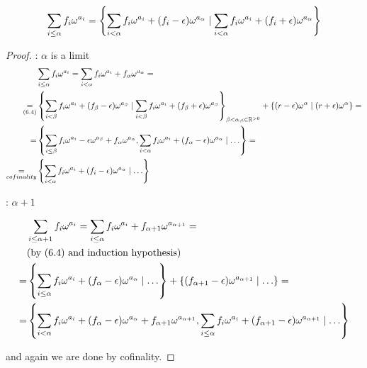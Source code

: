 
\begin{corollary} %
\begin{align*}
	\sum_{i \leq \alpha} f_i\omega^{a_i} =
	\left\{  \sum_{i < \alpha} f_i\omega^{a_i} + (f_i - \epsilon) \omega^{a_\alpha} \mid
	\sum_{i < \alpha} f_i\omega^{a_i} + (f_i + \epsilon) \omega^{a_\alpha}  \right\}
\end{align*}
 \end{corollary}

\begin{proof} %

: $\alpha$ is a limit
\begin{align*}
	&\sum_{i \leq \alpha} f_i\omega^{a_i} = \sum_{i < \alpha} f_i\omega^{a_i} + f_\alpha\omega^{a_\alpha} = \\ \underset{(6.4)}{=}
	&\left\{ \sum_{i < \beta} f_i \omega^{a_i} + (f_\beta - \epsilon)\omega^{a_\beta} \mid
	\sum_{i < \beta} f_i \omega^{a_i} + (f_\beta + \epsilon)\omega^{a_\beta} \right\}_{\beta < \alpha, \epsilon \in \mathbb{R}^{>0}}
	+ \left\{ (r - \epsilon) \omega^\alpha \mid (r+\epsilon)\omega^\alpha \right\} = \\ =
	&\left\{ \sum_{i \leq \beta} f_i \omega^{a_i} - \epsilon\omega^{a_\beta} + f_\alpha\omega^{a_\alpha},
	\sum_{i < \alpha} f_i \omega^{a_i} + (f_\alpha - \epsilon)\omega^{a_\alpha} \mid \ldots \right\} = \\ \underset{cofinality}{=}
	&\left\{  \sum_{i < \alpha} f_i\omega^{a_i} + (f_i - \epsilon) \omega^{a_\alpha} \mid \ldots  \right\}
\end{align*}

: $\alpha + 1$

\begin{align*}
	&\sum_{i \leq \alpha + 1} f_i \omega^{a_i} = \sum_{i \leq \alpha} f_i \omega^{a_i} + f_{\alpha + 1} \omega^{a_{\alpha + 1}} = \\
	&\text{(by (6.4) and induction hypothesis)} \\
	= &\left\{ \sum_{i \leq \alpha} f_i \omega^{a_i} + (f_{\alpha} - \epsilon) \omega^{a_\alpha} \mid \ldots \right\} +
	\left\{ (f_{\alpha + 1} - \epsilon) \omega^{a_{\alpha + 1}} \mid \ldots \right\} =  \\
	= &\left\{ \sum_{i < \alpha} f_i \omega^{a_i} + (f_{\alpha} - \epsilon) \omega^{a_\alpha} + f_{\alpha + 1} \omega^{a_{\alpha + 1}},
	\sum_{i \leq \alpha} f_i \omega^{a_i} + (f_{\alpha + 1} - \epsilon) \omega^{a_{\alpha + 1}} \mid \ldots \right\}
\end{align*}

and again we are done by cofinality.
 \end{proof}
